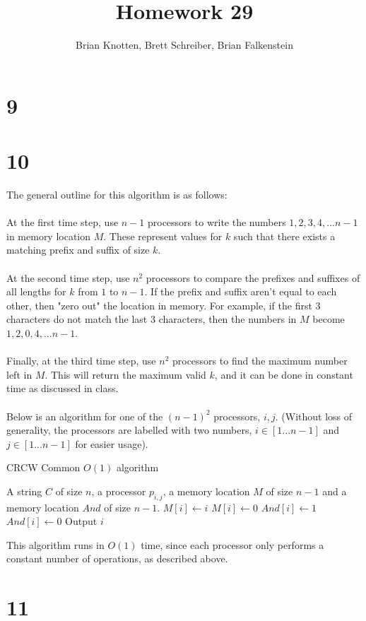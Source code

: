 \documentclass[letterpaper,notitlepage,twoside]{article}
\begin{document}
\title{Homework 29}
\author{Brian Knotten, Brett Schreiber, Brian Falkenstein}
\maketitle

\section*{9}

\section*{10}
The general outline for this algorithm is as follows:
\\\\
At the first time step, use $n - 1$ processors to write the numbers $1, 2, 3, 4, ... n - 1$ in memory location $M$. These represent values for $k$ such that there exists a matching prefix and suffix of size $k$.
\\\\
At the second time step, use $n^2$ processors to compare the prefixes and suffixes of all lengths for $k$ from $1$ to $n - 1$. If the prefix and suffix aren't equal to each other, then "zero out" the location in memory. For example, if the first 3 characters do not match the last 3 characters, then the numbers in $M$ become $1, 2, 0, 4, ... n -1$.
\\\\
Finally, at the third time step, use $n^2$ processors to find the maximum number left in $M$. This will return the maximum valid $k$, and it can be done in constant time as discussed in class.
\\\\
Below is an algorithm for one of the $(n - 1)^2$ processors, $i, j$. (Without loss of generality, the processors are labelled with two numbers, $i \in [1...n-1]$ and $j \in [1...n-1]$ for easier usage).

\begin{algorithm}
    \begin{algorithmic}%
        \caption{CRCW Common $O(1)$ algorithm}
        \Require A string $C$ of size $n$, a processor $p_{i, j}$, a memory location $M$ of size $n - 1$ and a memory location $And$ of size $n - 1$.
        \State $M[i] \gets i$ 
            \State $M[i] \gets 0$ 
        \EndIf
        \State $And[i] \gets 1$ 
         
            \State $And[i] \gets 0$ 
        \EndIf
            \State Output $i$ 
        \EndIf
    \end{algorithmic}
\end{algorithm}

This algorithm runs in $O(1)$ time, since each processor only performs a constant number of operations, as described above.

\section*{11}
\end{document}
